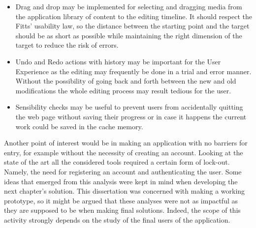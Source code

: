 \begin{itemize}
\item Drag and drop may be implemented for selecting and dragging media from the application library of content to the editing timeline. It should respect the Fitts' usability law, so the distance between the starting point and the target should be as short as possible while maintaining the right dimension of the target to reduce the risk of errors.
\item Undo and Redo actions with history may be important for the User Experience as the editing may frequently be done in a trial and error manner. Without the possibility of going back and forth between the new and old modifications the whole editing process may result tedious for the user.
\item Sensibility checks may be useful to prevent users from accidentally quitting the web page without saving their progress or in case it happens the current work could be saved in the cache memory.
\end{itemize}

Another point of interest would be in making an application with no barriers for entry, for example without the necessity of creating an account. Looking at the state of the art all the considered tools required a certain form of lock-out. Namely, the need for registering an account and authenticating the user.
Some ideas that emerged from this analysis were kept in mind when developing the next chapter’s solution. This dissertation was concerned with making a working prototype, so it might be argued that these analyses were not as impactful as they are supposed to be when making final solutions. Indeed, the scope of this activity strongly depends on the study of the final users of the application.